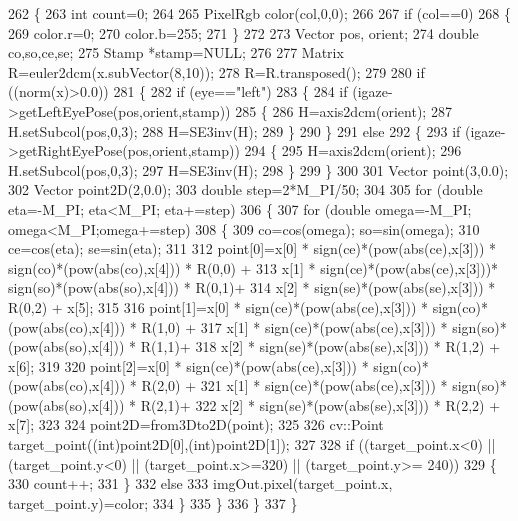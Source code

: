 \begin{DoxyCode}
262 \{
263     \textcolor{keywordtype}{int} count=0;
264 
265     PixelRgb color(col,0,0);
266 
267     \textcolor{keywordflow}{if} (col==0)
268     \{
269         color.r=0;
270         color.b=255;
271     \}
272 
273     Vector pos, orient;
274     \textcolor{keywordtype}{double} co,so,ce,se;
275     Stamp *stamp=NULL;
276 
277     Matrix R=euler2dcm(x.subVector(8,10));
278     R=R.transposed();
279 
280     \textcolor{keywordflow}{if} ((norm(x)>0.0))
281     \{
282         \textcolor{keywordflow}{if} (eye==\textcolor{stringliteral}{"left"})
283         \{
284             \textcolor{keywordflow}{if} (igaze->getLeftEyePose(pos,orient,stamp))
285             \{
286                 H=axis2dcm(orient);
287                 H.setSubcol(pos,0,3);
288                 H=SE3inv(H);
289             \}
290         \}
291         \textcolor{keywordflow}{else}
292         \{
293             \textcolor{keywordflow}{if} (igaze->getRightEyePose(pos,orient,stamp))
294             \{
295                 H=axis2dcm(orient);
296                 H.setSubcol(pos,0,3);
297                 H=SE3inv(H);
298             \}
299         \}
300 
301         Vector point(3,0.0);
302         Vector point2D(2,0.0);
303         \textcolor{keywordtype}{double} step=2*M\_PI/50;
304 
305         \textcolor{keywordflow}{for} (\textcolor{keywordtype}{double} eta=-M\_PI; eta<M\_PI; eta+=step)
306         \{
307              \textcolor{keywordflow}{for} (\textcolor{keywordtype}{double} omega=-M\_PI; omega<M\_PI;omega+=step)
308              \{
309                  co=cos(omega); so=sin(omega);
310                  ce=cos(eta); se=sin(eta);
311 
312                  point[0]=x[0] * sign(ce)*(pow(abs(ce),x[3])) * sign(co)*(pow(abs(co),x[4])) * R(0,0) +
313                             x[1] * sign(ce)*(pow(abs(ce),x[3]))* sign(so)*(pow(abs(so),x[4])) * R(0,1)+
314                                 x[2] * sign(se)*(pow(abs(se),x[3])) * R(0,2) + x[5];
315 
316                  point[1]=x[0] * sign(ce)*(pow(abs(ce),x[3])) * sign(co)*(pow(abs(co),x[4])) * R(1,0) +
317                             x[1] * sign(ce)*(pow(abs(ce),x[3])) * sign(so)*(pow(abs(so),x[4])) * R(1,1)+
318                                 x[2] * sign(se)*(pow(abs(se),x[3])) * R(1,2) + x[6];
319 
320                  point[2]=x[0] * sign(ce)*(pow(abs(ce),x[3])) * sign(co)*(pow(abs(co),x[4])) * R(2,0) +
321                             x[1] * sign(ce)*(pow(abs(ce),x[3])) * sign(so)*(pow(abs(so),x[4])) * R(2,1)+
322                                 x[2] * sign(se)*(pow(abs(se),x[3])) * R(2,2) + x[7];
323 
324                  point2D=from3Dto2D(point);
325 
326                  cv::Point target\_point((\textcolor{keywordtype}{int})point2D[0],(\textcolor{keywordtype}{int})point2D[1]);
327 
328                  \textcolor{keywordflow}{if} ((target\_point.x<0) || (target\_point.y<0) || (target\_point.x>=320) || (target\_point.y>=
      240))
329                  \{
330                      count++;
331                  \}
332                  \textcolor{keywordflow}{else}
333                     imgOut.pixel(target\_point.x, target\_point.y)=color;
334              \}
335          \}
336     \}
337 \}
\end{DoxyCode}
